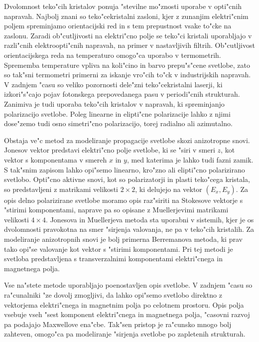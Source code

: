 \documentclass[12pt,twoside,openright,final]{report}
\begin{document}
Dvolomnost teko"cih kristalov ponuja "stevilne mo"znosti uporabe v opti"cnih napravah. 
Najbolj znani so teko"cekristalni zasloni, kjer z zunanjim elektri"cnim poljem spreminjamo orientacijski red in s tem prepustnost vsake to"cke na zaslonu. 
Zaradi ob"cutljivosti na elektri"cno polje se teko"ci kristali uporabljajo v razli"cnih elektroopti"cnih napravah, na primer v nastavljivih filtrih. 
Ob"cutljivost orientacijskega reda na temperaturo omogo"ca uporabo v termometrih. 
Sprememba temperature vpliva na koli"cino in barvo prepu"s"cene svetlobe, zato so tak"sni termometri primerni za iskanje vro"cih to"ck v industrijskih napravah\cite{hot-spots}. 
V zadnjem "casu so veliko pozornosti dele"zni teko"cekristalni laserji, ki izkori"s"cajo pojav fotonskega prepovedanega pasu v periodi"cnih strukturah\cite{humar-musevic,coles-morris}. 
Zanimiva je tudi uporaba teko"cih kristalov v napravah, ki spreminjanjo polarizacijo svetlobe. 
Poleg linearne in elipti"cne polarizacije lahko z njimi dose"zemo tudi osno simetri"cno polarizacijo, torej radialno ali azimutalno\cite{polarization-converters-linear,polarization-converters-axial}. 

Obstaja ve"c metod za modeliranje propagacije svetlobe skozi anizotropne snovi. 
Jonesov vektor predstavi elektri"cno polje svetlobe, ki se "siri v smeri $z$, kot vektor s komponentama v smereh $x$ in $y$, med katerima je lahko tudi fazni zamik. 
S tak"snim zapisom lahko opi"semo linearno, kro"zno ali elipti"cno polarizirano svetlobo\cite{optics-lcd}. 
Opti"cno aktivne snovi, kot so polarizatorji in plasti teko"cega kristala, so predstavljeni z matrikami velikosti $2\times 2$, ki delujejo na vektor $(E_x, E_y)$. 
Za opis delno polarizirane svetlobe moramo opis raz"siriti na Stokesove vektorje s "stirimi komponentami, naprave pa so opisane z Muellerjevimi matrikami velikosti $4\times 4$.
Jonesova in Muellerjeva metoda sta uporabni v sistemih, kjer je os dvolomnosti pravokotna na smer "sirjenja valovanja, ne pa v teko"cih kristalih. 
Za modeliranje anizotropnih snovi je bolj primerna Berremanova metoda\cite{berreman,stallinga-berreman}, ki prav tako opi"se valovanje kot vektor s "stirimi komponentami. 
Pri tej metodi je svetloba predstavljena s transverzalnimi komponentami elektri"cnega in magnetnega polja. 

Vse na"stete metode uporabljajo poenostavljen opis svetlobe. 
V zadnjem "casu so ra"cunalniki "ze dovolj zmogljivi, da lahko opi"semo svetlobo direktno z vektorjema elektri"cnega in magnetnim polja po celotnem prostoru. 
Opis polja vsebuje vseh "sest komponent elektri"cnega in magnetnega polja, "casovni razvoj pa podajajo Maxwellove ena"cbe. 
Tak"sen pristop je ra"cunsko mnogo bolj zahteven, omogo"ca pa modeliranje "sirjenja svetlobe po zapletenih strukturah\cite{taflove, hwang-rey}. 
\end{document}
